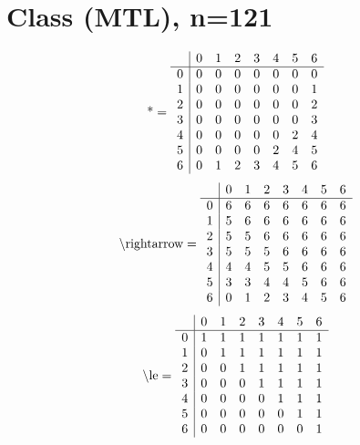 \documentclass[11pt]{article}
\begin{document}
\section{Class (MTL), n=121}
\[\text{*} = 
\begin{array}{r | r r r r r r r}
 & 0 & 1 & 2 & 3 & 4 & 5 & 6 \\ \hline
0 & 0 & 0 & 0 & 0 & 0 & 0 & 0 \\
1 & 0 & 0 & 0 & 0 & 0 & 0 & 1 \\
2 & 0 & 0 & 0 & 0 & 0 & 0 & 2 \\
3 & 0 & 0 & 0 & 0 & 0 & 0 & 3 \\
4 & 0 & 0 & 0 & 0 & 0 & 2 & 4 \\
5 & 0 & 0 & 0 & 0 & 2 & 4 & 5 \\
6 & 0 & 1 & 2 & 3 & 4 & 5 & 6 \\
\end{array}
\]
\[\text{\textbackslash rightarrow} = 
\begin{array}{r | r r r r r r r}
 & 0 & 1 & 2 & 3 & 4 & 5 & 6 \\ \hline
0 & 6 & 6 & 6 & 6 & 6 & 6 & 6 \\
1 & 5 & 6 & 6 & 6 & 6 & 6 & 6 \\
2 & 5 & 5 & 6 & 6 & 6 & 6 & 6 \\
3 & 5 & 5 & 5 & 6 & 6 & 6 & 6 \\
4 & 4 & 4 & 5 & 5 & 6 & 6 & 6 \\
5 & 3 & 3 & 4 & 4 & 5 & 6 & 6 \\
6 & 0 & 1 & 2 & 3 & 4 & 5 & 6 \\
\end{array}
\]
\[\text{\textbackslash le} = 
\begin{array}{r | r r r r r r r}
 & 0 & 1 & 2 & 3 & 4 & 5 & 6 \\ \hline
0 & 1 & 1 & 1 & 1 & 1 & 1 & 1 \\
1 & 0 & 1 & 1 & 1 & 1 & 1 & 1 \\
2 & 0 & 0 & 1 & 1 & 1 & 1 & 1 \\
3 & 0 & 0 & 0 & 1 & 1 & 1 & 1 \\
4 & 0 & 0 & 0 & 0 & 1 & 1 & 1 \\
5 & 0 & 0 & 0 & 0 & 0 & 1 & 1 \\
6 & 0 & 0 & 0 & 0 & 0 & 0 & 1 \\
\end{array}
\]
\end{document}
